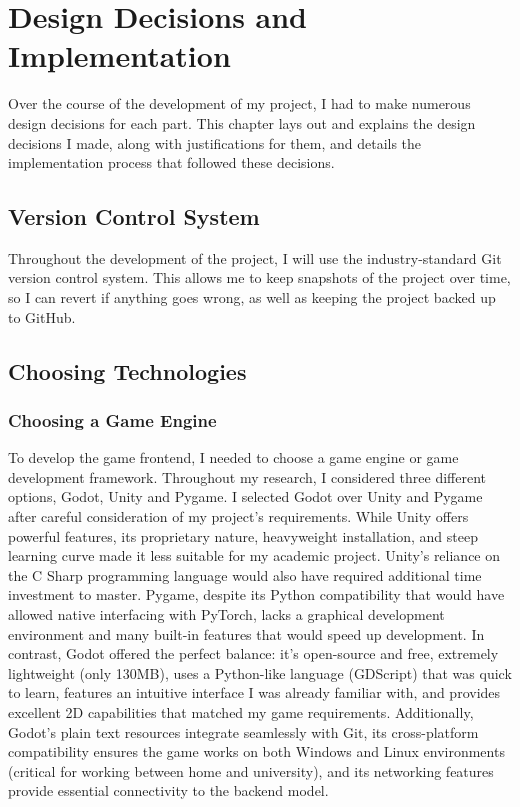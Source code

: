 \chapter{Design Decisions and Implementation}

Over the course of the development of my project, I had to make numerous design decisions for each part. 
This chapter lays out and explains the design decisions I made, along with justifications for them, and details the implementation process that followed these decisions.

\section{Version Control System}

Throughout the development of the project, I will use the industry-standard Git version control system. 
This allows me to keep snapshots of the project over time, so I can revert if anything goes wrong, as well as keeping the project backed up to GitHub.

\section{Choosing Technologies}

\subsection{Choosing a Game Engine}

To develop the game frontend, I needed to choose a game engine or game development framework. Throughout my research, I considered three different options, Godot, Unity and Pygame.
I selected Godot over Unity and Pygame after careful consideration of my project's requirements. 
While Unity offers powerful features, its proprietary nature, heavyweight installation, and steep learning curve made it less suitable for my academic project. 
Unity's reliance on the C Sharp programming language would also have required additional time investment to master. 
Pygame, despite its Python compatibility that would have allowed native interfacing with PyTorch, lacks a graphical development environment and many built-in features that would speed up development. 
In contrast, Godot offered the perfect balance: it's open-source and free, extremely lightweight (only 130MB), uses a Python-like language (GDScript) that was quick to learn, features an intuitive interface I was already familiar with, and provides excellent 2D capabilities that matched my game requirements.
Additionally, Godot's plain text resources integrate seamlessly with Git, its cross-platform compatibility ensures the game works on both Windows and Linux environments (critical for working between home and university), and its networking features provide essential connectivity to the backend model.

